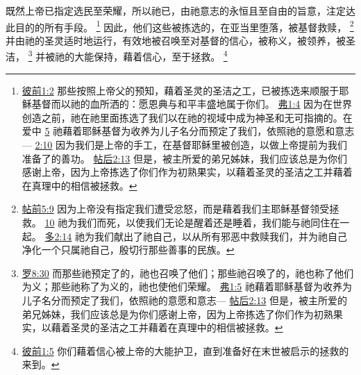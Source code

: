 \documentclass[12pt, a4paper, oneside]{ctexart}
\newcounter{parnum}[section]
\newcommand{\N}{%
   \noindent\refstepcounter{parnum}%
    \makebox[\parindent][l]{\textbf{\arabic{parnum}.}}}
\begin{document}
	
\N 既然上帝已指定选民至荣耀，所以祂已，由祂意志的永恒且至自由的旨意，注定达此目的的所有手段。
	\footnote {
		\href{https://biblehub.com/1_peter/1-2.htm}{彼前1:2} 那些按照上帝父的预知，藉着圣灵的圣洁之工，已被拣选来顺服于耶稣基督而以祂的血所洒的：愿恩典与和平丰盛地属于你们。
		\href{https://biblehub.com/ephesians/1-4.htm}{弗1:4} 因为在世界创造之前，祂在祂里面拣选了我们以在祂的视域中成为神圣和无可指摘的。在爱中
		\href{https://biblehub.com/ephesians/1-5.htm}{5} 祂藉着耶稣基督为收养为儿子名分而预定了我们，依照祂的意愿和意志---
		\href{https://biblehub.com/ephesians/2-10.htm}{2:10} 因为我们是上帝的手工，在基督耶稣里被创造，以做上帝提前为我们准备了的善功。
		\href{https://biblehub.com/2_thessalonians/2-13.htm}{帖后2:13} 但是，被主所爱的弟兄姊妹，我们应该总是为你们感谢上帝，因为上帝拣选了你们作为初熟果实，以藉着圣灵的圣洁之工并藉着在真理中的相信被拯救。
	}
	因此，他们这些被拣选的，在亚当里堕落，被基督救赎，
	\footnote {
		\href{https://biblehub.com/1_thessalonians/5-9.htm}{帖前5:9} 因为上帝没有指定我们遭受忿怒，而是藉着我们主耶稣基督领受拯救。
		\href{https://biblehub.com/1_thessalonians/5-10.htm}{10} 祂为我们而死，以使我们无论是醒着还是睡着，我们能与祂同住在一起。
		\href{https://biblehub.com/titus/2-14.htm}{多2:14} 祂为我们献出了祂自己，以从所有邪恶中救赎我们，并为祂自己净化一个只属祂自己，殷切行那些善事的民族。
	}
	并由祂的圣灵适时地运行，有效地被召唤至对基督的信心，被称义，被领养，被圣洁，
	\footnote {
		\href{https://biblehub.com/romans/8-30.htm}{罗8:30} 而那些祂预定了的，祂也召唤了他们；那些祂召唤了的，祂也称了他们为义；那些祂称了为义的，祂也使他们荣耀。
		\href{https://biblehub.com/ephesians/1-5.htm}{弗1:5} 祂藉着耶稣基督为收养为儿子名分而预定了我们，依照祂的意愿和意志---
		\href{https://biblehub.com/2_thessalonians/2-13.htm}{帖后2:13} 但是，被主所爱的弟兄姊妹，我们应该总是为你们感谢上帝，因为上帝拣选了你们作为初熟果实，以藉着圣灵的圣洁之工并藉着在真理中的相信被拯救。
	}
	并被祂的大能保持，藉着信心，至于拯救。
	\footnote {
		\href{https://biblehub.com/1_peter/1-5.htm}{彼前1:5} 你们藉着信心被上帝的大能护卫，直到准备好在末世被启示的拯救的来到。
	}
\end{document}
